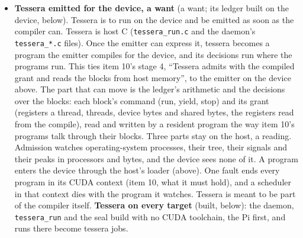 \begin{enumerate}
\begin{itemize}
\begin{itemize}
\begin{itemize}
\item \textbf{Built} (everything on the device). The emitter's decisions, keymath's imprint and key\_\allowbreak{}schedule's position are each one source the host and the device compile (\texttt{codegen\_\allowbreak{}core.\allowbreak{}h}, \texttt{keymath\_\allowbreak{}core.\allowbreak{}h}, \texttt{key\_\allowbreak{}schedule\_\allowbreak{}core.\allowbreak{}h}). The device positions a program's step table, decides each step's forms a thread a step, cuts the lane into states in one thread, and writes the lane's text with the text program (\texttt{asm\_\allowbreak{}printer.\allowbreak{}h}, \texttt{codegen\_\allowbreak{}device.\allowbreak{}h}). \texttt{CODEGEN\_\allowbreak{}DEVICE=1} has the record machine's lanes written by the device and checked against the host's text byte for byte. \textbf{Measured}, each device run a tessera job on Windows (RTX 3070): \texttt{codegen\_\allowbreak{}test} 121 checks, 0 failed, the bootstrap included, the emitter's text in PTX 170,922, C 412,182 and VHDL 554,754 bytes; \texttt{CODEGEN\_\allowbreak{}DEVICE=1} \texttt{record\_\allowbreak{}bitwise\_\allowbreak{}test} 25 checks, 0 failed, 8 programs written by the device byte for byte the host's, the largest 4,204 steps and 2,051,022 bytes. Not exercised: \texttt{engine.\allowbreak{}cu}'s \texttt{engine\_\allowbreak{}record\_\allowbreak{}position\_\allowbreak{}device}.
\end{itemize}
\item \textbf{Tessera emitted for the device, a want} (a want; its ledger built on the device, below). Tessera is to run on the device and be emitted as soon as the compiler can. Tessera is host C (\texttt{tessera\_\allowbreak{}run.\allowbreak{}c} and the daemon's \texttt{tessera\_\allowbreak{}*.\allowbreak{}c} files). Once the emitter can express it, tessera becomes a program the emitter compiles for the device, and its decisions run where the programs run. This ties item 10's stage 4, “Tessera admits with the compiled grant and reads the blocks from host memory”, to the emitter on the device above. The part that can move is the ledger's arithmetic and the decisions over the blocks: each block's command (run, yield, stop) and its grant (registers a thread, threads, device bytes and shared bytes, the registers read from the compile), read and written by a resident program the way item 10's programs talk through their blocks. Three parts stay on the host, a reading. Admission watches operating-system processes, their tree, their signals and their peaks in processors and bytes, and the device sees none of it. A program enters the device through the host's loader (above). One fault ends every program in its CUDA context (item 10, what it must hold), and a scheduler in that context dies with the program it watches. Tessera is meant to be part of the compiler itself. \textbf{Tessera on every target} (built, below): the daemon, \texttt{tessera\_\allowbreak{}run} and the seal build with no CUDA toolchain, the Pi first, and runs there become tessera jobs.


\end{itemize}
\end{itemize}
\end{enumerate}

